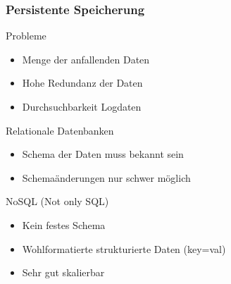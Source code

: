 \begin{frame}
\frametitle{Persistente Speicherung}


\begin{alertblock}{Probleme}
    \begin{itemize}
        \item Menge der anfallenden Daten
        \item Hohe Redundanz der Daten
        \item Durchsuchbarkeit Logdaten
    \end{itemize}
\end{alertblock}

\pause

\begin{alertblock}{Relationale Datenbanken}
    \begin{itemize}
        \item Schema der Daten muss bekannt sein
        \item Schemaänderungen nur schwer möglich
    \end{itemize}
\end{alertblock}
\pause

\begin{exampleblock}{NoSQL (Not only SQL)}
    \begin{itemize}
        \item Kein festes Schema
        \item Wohlformatierte strukturierte Daten (key=val)
        \item Sehr gut skalierbar
    \end{itemize}
\end{exampleblock}
\end{frame}

